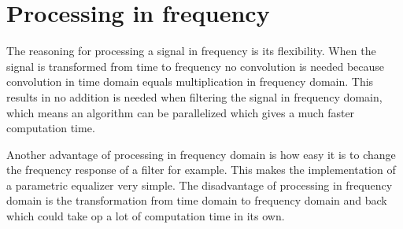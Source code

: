 \section{Processing in frequency}
The reasoning for processing a signal in frequency is its flexibility. When the signal is transformed from time to frequency no convolution is needed because convolution in time domain equals multiplication in frequency domain. This results in no addition is needed when filtering the signal in frequency domain, which means an algorithm can be parallelized which gives a much faster computation time. 

Another advantage of processing in frequency domain is how easy it is to change the frequency response of a filter for example. This makes the implementation of a parametric equalizer very simple. The disadvantage of processing in frequency domain is the transformation from time domain to frequency domain and back which could take op a lot of computation time in its own. 

